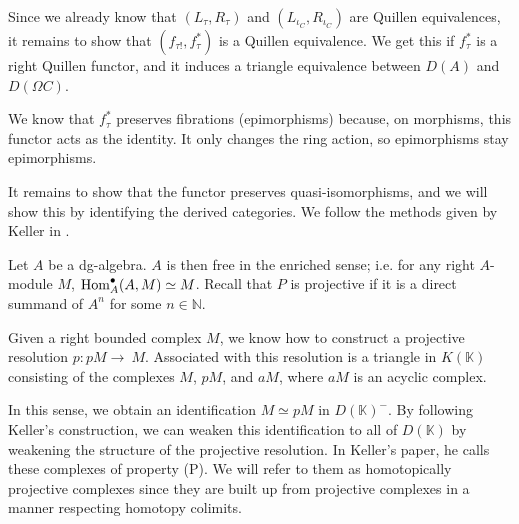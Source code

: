 \documentclass[../thesis.tex]{subfiles}
\begin{document}
            Since we already know that $(L_\tau, R_\tau)$ and $(L_{\iota_C}, R_{\iota_C})$ are Quillen equivalences, it remains to show that $(f_{\tau !},f_\tau^*)$ is a Quillen equivalence. We get this if $f_\tau^*$ is a right Quillen functor, and it induces a triangle equivalence between $D(A)$ and $D(\Omega C)$.

            We know that $f_\tau^*$ preserves fibrations (epimorphisms) because, on morphisms, this functor acts as the identity. It only changes the ring action, so epimorphisms stay epimorphisms. 
            
            It remains to show that the functor preserves quasi-isomorphisms, and we will show this by identifying the derived categories. We follow the methods given by Keller in \cite{Keller94}.

            Let $A$ be a dg-algebra. $A$ is then free in the enriched sense; i.e. for any right $A$-module $M$, ${\tt{Hom}}^\bullet_A(A,M) \simeq M$. Recall that $P$ is projective if it is a direct summand of $A^n$ for some $n\in \mathbb{N}$. 
            
            Given a right bounded complex $M$, we know how to construct a projective resolution $p:pM\rightarrow~M$. Associated with this resolution is a triangle in $K(\mathbb{K})$ consisting of the complexes $M$, $pM$, and $aM$, where $aM$ is an acyclic complex.

            \begin{center}
            \end{center}

            In this sense, we obtain an identification $M \simeq pM$ in $D(\mathbb{K})^-$. By following Keller's construction, we can weaken this identification to all of $D(\mathbb{K})$ by weakening the structure of the projective resolution. In Keller's paper, he calls these complexes of property (P). We will refer to them as homotopically projective complexes since they are built up from projective complexes in a manner respecting homotopy colimits.
\end{document}
